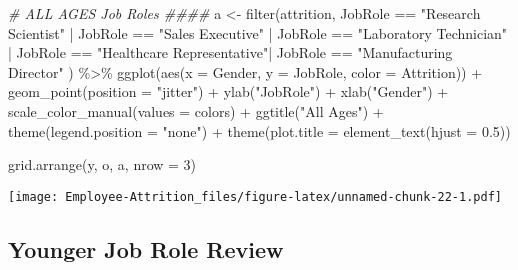 \documentclass[
]{article}
\newenvironment{Shaded}{\begin{snugshade}}{\end{snugshade}}
\newcommand{\AttributeTok}[1]{\textcolor[rgb]{0.77,0.63,0.00}{#1}}
\newcommand{\CommentTok}[1]{\textcolor[rgb]{0.56,0.35,0.01}{\textit{#1}}}
\newcommand{\DecValTok}[1]{\textcolor[rgb]{0.00,0.00,0.81}{#1}}
\newcommand{\FloatTok}[1]{\textcolor[rgb]{0.00,0.00,0.81}{#1}}
\newcommand{\FunctionTok}[1]{\textcolor[rgb]{0.00,0.00,0.00}{#1}}
\newcommand{\NormalTok}[1]{#1}
\newcommand{\OtherTok}[1]{\textcolor[rgb]{0.56,0.35,0.01}{#1}}
\newcommand{\SpecialCharTok}[1]{\textcolor[rgb]{0.00,0.00,0.00}{#1}}
\newcommand{\StringTok}[1]{\textcolor[rgb]{0.31,0.60,0.02}{#1}}
\begin{document}
\begin{Shaded}
\begin{Highlighting}[]
\CommentTok{\# ALL AGES Job Roles \#\#\#\#}
\NormalTok{a }\OtherTok{\textless{}{-}} \FunctionTok{filter}\NormalTok{(attrition, JobRole }\SpecialCharTok{==} \StringTok{"Research Scientist"} \SpecialCharTok{|}\NormalTok{ JobRole }\SpecialCharTok{==} \StringTok{"Sales Executive"}  \SpecialCharTok{|}\NormalTok{ JobRole }\SpecialCharTok{==} \StringTok{"Laboratory Technician"} \SpecialCharTok{|}\NormalTok{ JobRole }\SpecialCharTok{==} \StringTok{"Healthcare Representative"}\SpecialCharTok{|}\NormalTok{ JobRole }\SpecialCharTok{==} \StringTok{"Manufacturing Director"}\NormalTok{ ) }\SpecialCharTok{\%\textgreater{}\%}
  \FunctionTok{ggplot}\NormalTok{(}\FunctionTok{aes}\NormalTok{(}\AttributeTok{x =}\NormalTok{ Gender, }\AttributeTok{y =}\NormalTok{ JobRole, }\AttributeTok{color =}\NormalTok{ Attrition)) }\SpecialCharTok{+}
  \FunctionTok{geom\_point}\NormalTok{(}\AttributeTok{position =} \StringTok{"jitter"}\NormalTok{) }\SpecialCharTok{+}
  \FunctionTok{ylab}\NormalTok{(}\StringTok{"JobRole"}\NormalTok{) }\SpecialCharTok{+}
  \FunctionTok{xlab}\NormalTok{(}\StringTok{"Gender"}\NormalTok{) }\SpecialCharTok{+}
  \FunctionTok{scale\_color\_manual}\NormalTok{(}\AttributeTok{values =}\NormalTok{ colors) }\SpecialCharTok{+}
  \FunctionTok{ggtitle}\NormalTok{(}\StringTok{"All Ages"}\NormalTok{) }\SpecialCharTok{+}
  \FunctionTok{theme}\NormalTok{(}\AttributeTok{legend.position =} \StringTok{"none"}\NormalTok{) }\SpecialCharTok{+}
  \FunctionTok{theme}\NormalTok{(}\AttributeTok{plot.title =} \FunctionTok{element\_text}\NormalTok{(}\AttributeTok{hjust =} \FloatTok{0.5}\NormalTok{)) }

\FunctionTok{grid.arrange}\NormalTok{(y, o, a, }\AttributeTok{nrow =} \DecValTok{3}\NormalTok{)}
\end{Highlighting}
\end{Shaded}

\texttt{[image: Employee-Attrition\_files/figure-latex/unnamed-chunk-22-1.pdf]}

\hypertarget{younger-job-role-review}{%
\subsection{Younger Job Role Review}\label{younger-job-role-review}}
\end{document}
